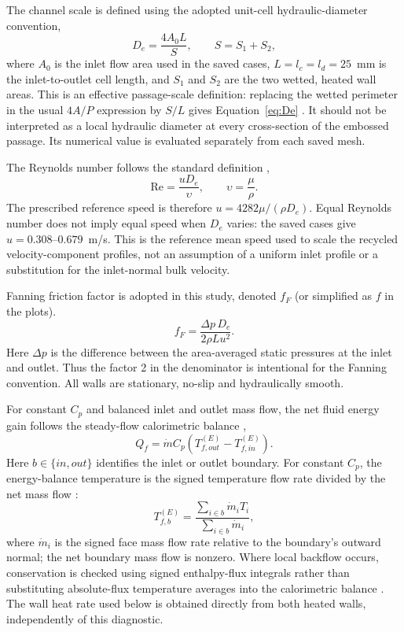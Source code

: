 The channel scale is defined using the adopted unit-cell hydraulic-diameter convention,
\begin{equation}
D_e=\frac{4A_0 L}{S},\qquad S=S_1+S_2 ,
\label{eq:De}
\end{equation}
where $A_0$ is the inlet flow area used in the saved cases, $L=l_c=l_d=25$~mm is the inlet-to-outlet cell length, and $S_1$ and $S_2$ are the two wetted, heated wall areas. This is an effective passage-scale definition: replacing the wetted perimeter in the usual $4A/P$ expression by $S/L$ gives Equation~\eqref{eq:De} \citep{zohuri2017,thulukkanam2013}. It should not be interpreted as a local hydraulic diameter at every cross-section of the embossed passage. Its numerical value is evaluated separately from each saved mesh.

The Reynolds number follows the standard definition \citep{cengel2014,thulukkanam2013},
\begin{equation}
\mathrm{Re}=\frac{uD_e}{\upsilon},\qquad \upsilon=\frac{\mu}{\rho}.
\label{eq:Re}
\end{equation}
The prescribed reference speed is therefore $u=4282\mu/(\rho D_e)$. Equal Reynolds number does not imply equal speed when $D_e$ varies: the saved cases give $u=0.308$--$0.679$~m/s. This is the reference mean speed used to scale the recycled velocity-component profiles, not an assumption of a uniform inlet profile or a substitution for the inlet-normal bulk velocity.

Fanning friction factor is adopted in this study, denoted $f_F$ (or simplified as $f$ in the plots). \citep{cengel2014,thulukkanam2013}
\begin{equation}
f_F=\frac{\Delta p\,D_e}{2\rho L u^2}.
\label{eq:f}
\end{equation}
Here $\Delta p$ is the difference between the area-averaged static pressures at the inlet and outlet. Thus the factor 2 in the denominator is intentional for the Fanning convention. All walls are stationary, no-slip and hydraulically smooth.

For constant $C_p$ and balanced inlet and outlet mass flow, the net fluid energy gain follows the steady-flow calorimetric balance \citep{thulukkanam2013,jiang2019a},
\begin{equation}
Q_f=\dot m C_p\left(T_{f,out}^{(E)}-T_{f,in}^{(E)}\right).
\label{eq:Q}
\end{equation}
Here $b\in\{in,out\}$ identifies the inlet or outlet boundary. For constant $C_p$, the energy-balance temperature is the signed temperature flow rate divided by the net mass flow \citep[Section~25.3.1, Equations~25--16 and~25--17]{ansys2025surface}:
\[
T_{f,b}^{(E)}=\frac{\sum_{i\in b}\dot m_i T_i}{\sum_{i\in b}\dot m_i},
\]
where $\dot m_i$ is the signed face mass flow rate relative to the boundary's outward normal; the net boundary mass flow is nonzero. Where local backflow occurs, conservation is checked using signed enthalpy-flux integrals rather than substituting absolute-flux temperature averages into the calorimetric balance \citep[Section~25.1]{ansys2025surface}. The wall heat rate used below is obtained directly from both heated walls, independently of this diagnostic.

